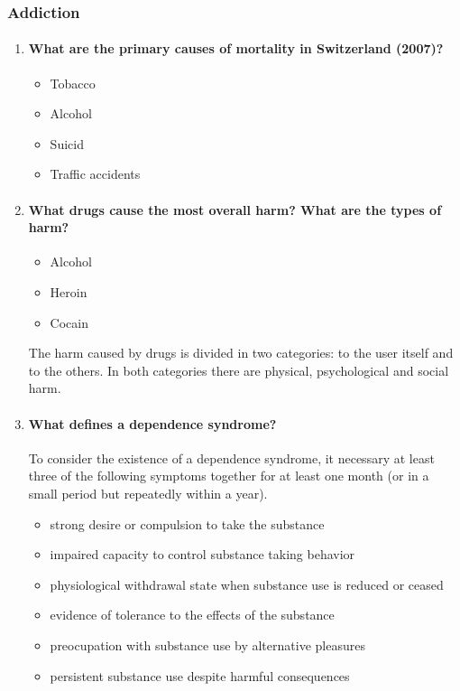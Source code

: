 \documentclass[12pt,article,oneside,a4paper]{memoir}
\begin{document}
\subsubsection{Addiction}
\begin{enumerate}
\item \paragraph{What are the primary causes of mortality in Switzerland
(2007)?}
\begin{itemize}
\item Tobacco
\item Alcohol
\item Suicid
\item Traffic accidents
\end{itemize}

\item \paragraph{What drugs cause the most overall harm? What are the types of
harm?}
\begin{itemize}
\item Alcohol
\item Heroin
\item Cocain
\end{itemize}
The harm caused by drugs is divided in two categories: to the user itself and
to the others. In both categories there are physical, psychological and social
harm.

\item \paragraph{What defines a dependence syndrome?}
To consider the existence of a dependence syndrome, it necessary at least three
of the following symptoms together for at least one month (or in a small period
but repeatedly within a year).

\begin{itemize}
\item strong desire or compulsion to take the substance
\item impaired capacity to control substance taking behavior
\item physiological withdrawal state when substance use is reduced or ceased
\item evidence of tolerance to the effects of the substance
\item preocupation with substance use by alternative pleasures
\item persistent substance use despite harmful consequences
\end{itemize}


\end{enumerate}
\end{document}
